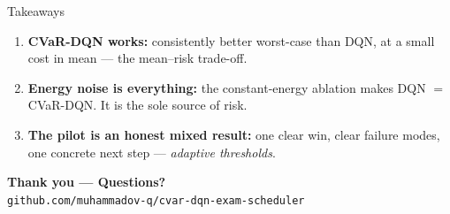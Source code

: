 \documentclass[aspectratio=169,11pt]{beamer}
\newcommand{\hl}[1]{{\color{accent}\textbf{#1}}}
\begin{document}
\begin{frame}{Takeaways}
  \begin{enumerate}
    \item \hl{CVaR-DQN works:} consistently better worst-case than DQN,
          at a small cost in mean --- the mean--risk trade-off.
    \item \hl{Energy noise is everything:} the constant-energy ablation
          makes DQN $=$ CVaR-DQN. It is the sole source of risk.
    \item \hl{The pilot is an honest mixed result:} one clear win, clear
          failure modes, one concrete next step --- \emph{adaptive thresholds}.
  \end{enumerate}
  \vfill
  \begin{center}
    {\Large\color{accent}\textbf{Thank you --- Questions?}}\\[0.4em]
    {\footnotesize\texttt{github.com/muhammadov-q/cvar-dqn-exam-scheduler}}
  \end{center}
\end{frame}
\end{document}
